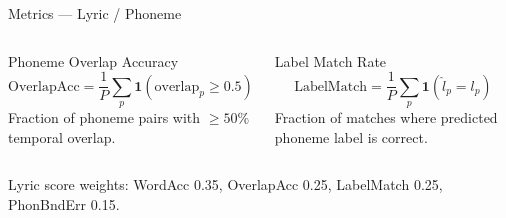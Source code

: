 \documentclass[aspectratio=169,9pt]{beamer}
\begin{document}
\begin{frame}{Metrics --- Lyric / Phoneme}
\begin{columns}[T]
      \begin{block}{Phoneme Overlap Accuracy}
        \[
          \mathrm{OverlapAcc}
            = \frac{1}{P}\sum_p\mathbf{1}(\mathrm{overlap}_p \ge 0.5)
        \]
        \footnotesize Fraction of phoneme pairs with $\ge 50\%$ temporal overlap.
      \end{block}
      \medskip
      \begin{block}{Label Match Rate}
        \[
          \mathrm{LabelMatch}
            = \frac{1}{P}\sum_p\mathbf{1}(\hat{l}_p = l_p)
        \]
        \footnotesize Fraction of matches where predicted phoneme label is correct.
      \end{block}
  \end{columns}
  \vspace{4pt}
  \footnotesize
  Lyric score weights:\; WordAcc 0.35,\; OverlapAcc 0.25,\;
  LabelMatch 0.25,\; PhonBndErr 0.15.
\end{frame}
\end{document}
